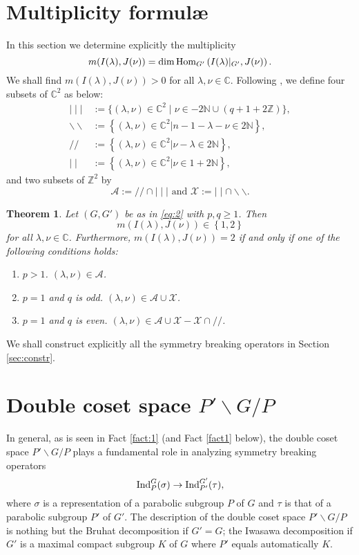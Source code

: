 \documentclass[reqno,12pt]{pja00} %
\newcommand{\mysetn}[2]{\left\{#1\big| #2\right\}}
\providecommand{\C}{\mathbb{C}}
\newcommand{\Z}{\mathbb{Z}}
\newcommand{\N}{\mathbb{N}}
\theoremstyle{plain}
\newcommand{\assign}{:=}
\newtheorem{theorem}{Theorem}[section]
\newcommand{\Ind}{\mbox{\normalfont Ind}}
\theoremstyle{definition}
\theoremstyle{exampstyle} \newtheorem{examp}[theorem]{Theorem}
\newcommand{\Hom}{\operatorname{Hom}}
\begin{document}
\section{Multiplicity formul\ae}
In this section we determine explicitly the multiplicity
\begin{equation*}
	m(I(\lambda),J(\nu))=\dim\Hom_{G'}\left( I(\lambda)\kern-0.1cm\mid_{G'},J(\nu) \right).
\end{equation*}
We shall find $m(I(\lambda),J(\nu))>0$ for all $\lambda,\nu\in\C$. 
Following {\cite{kobayashi2015symmetry}}, we define four subsets of $\C^2$ as below:
\begin{align*}
	 \mid \mid \mid &\assign \{ (\lambda, \nu) \in \mathbb{C}^2 \mid \nu \in
	- 2\mathbb{N} \cup (q + 1 + 2\mathbb{Z}) \},
\\
 \backslash\backslash&\assign\mysetn{(\lambda,\nu)\in\C^2}{n-1-\lambda-\nu\in2\N},
\\
 / / &\assign\mysetn{(\lambda, \nu) \in \mathbb{C}^2}{\nu-\lambda \in2\N },
\\
 \mid\mid&\assign\mysetn{(\lambda,\nu)\in\C^2}{\nu\in1+2\N},
\end{align*}
and two subsets of $\Z^2$ by 
\begin{equation*}
	\mathcal{A}:=//\cap\mid\mid\mid\mbox{ and }\mathcal{X}:=\mid\mid\cap\backslash\backslash.
\end{equation*}
\begin{theorem}
	Let $(G,G')$ be as in \eqref{eq:2} with $p,q\ge1$. Then\begin{equation*}
		m(I(\lambda),J(\nu))\in\left\{ 1,2 \right\}
	\end{equation*}
	for all $\lambda,\nu\in\C$. Furthermore, $m(I(\lambda),J(\nu))=2$ if and only if one of the following conditions holds:
	\begin{enumerate}[C{a}se 1.]
		\item $p>1$. $(\lambda,\nu)\in\mathcal{A}$.
		\item $p=1$ and $q$ is odd. $(\lambda,\nu)\in\mathcal{A}\cup\mathcal{X}$.
		\item $p=1$ and $q$ is even. $(\lambda,\nu)\in\mathcal{A}\cup\mathcal{X}-\mathcal{X}\cap//$.
	\end{enumerate}
	\label{thm:multiplicity}
\end{theorem}
We shall construct explicitly all the symmetry breaking operators in Section \ref{sec:constr}.
\section{Double coset space $P'\backslash G/P$}
In general, as is seen in Fact \ref{fact:1} (and Fact \ref{fact1} below), the double coset space $P'\backslash G/P$ plays a fundamental role in analyzing symmetry breaking operators\begin{equation*}
	\Ind_P^G(\sigma)\to\Ind_{P'}^{G'}(\tau),
\end{equation*}where $\sigma$ is a representation of a parabolic subgroup $P$ of $G$ 
and $\tau$ is that of a parabolic subgroup $P'$ of $G'$. The description of the double coset space $P'\backslash G/P$
is nothing but the Bruhat decomposition if $G'=G$; 
the Iwasawa decomposition if $G'$ is a maximal compact subgroup $K$ of $G$ 
where $P'$ equals automatically  $K$. 
\end{document}
